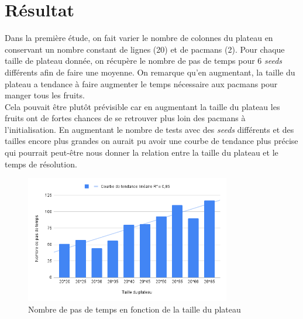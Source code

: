 \section{Résultat}

Dans la première étude, on fait varier le nombre de colonnes du plateau en conservant un nombre constant de lignes (20) et de \glspl{pacman} (2). Pour chaque taille de plateau donnée, on récupère le nombre de pas de temps pour 6 \textit{seeds} différents afin de faire une moyenne. On remarque qu’en augmentant, la taille du plateau a tendance à faire augmenter le temps nécessaire aux \glspl{pacman} pour manger tous les \glspl{fruit}.\\
Cela pouvait être plutôt prévisible car en augmentant la taille du plateau les \glspl{fruit} ont de fortes chances de se retrouver plus loin des \glspl{pacman} à l’initialisation.
En augmentant le nombre de tests avec des \textit{seeds} différents et des tailles encore plus grandes on aurait pu avoir une courbe de tendance plus précise qui pourrait peut-être nous donner la relation entre la taille du plateau et le temps de résolution.

\begin{figure}[H]
	\centering
	\includegraphics[width=0.8\textwidth]{image/resultat1}
	\caption{Nombre de pas de temps en fonction de la taille du plateau}
\end{figure}

